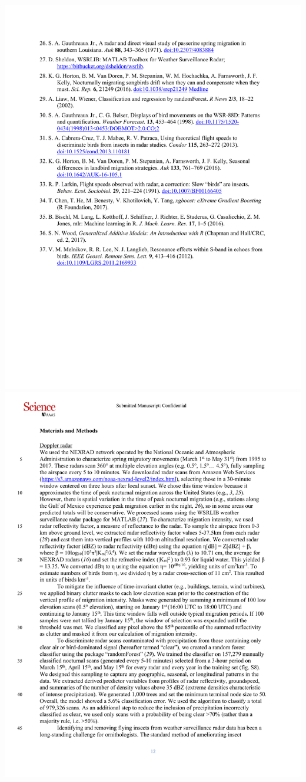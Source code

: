\documentclass[a4paper, twoside]{templates/ociamthesis}
\begin{document}
\includegraphics[width=1\linewidth]{pdf_chapters/forecast/forecast_supp_crop_Part18}
\includegraphics[width=1\linewidth]{pdf_chapters/forecast/forecast_supp_crop_Part2}
\end{document}
